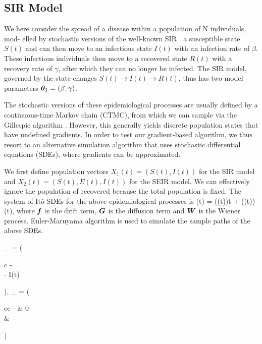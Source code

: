 \documentclass{article}
\theoremstyle{plain}
\theoremstyle{definition}
\theoremstyle{remark}
\newcommand{\Gv}{\bs{G}}
\newcommand{\SIR}{\text{SIR}}
\begin{document}
				\subsection{SIR Model}
				We here consider the spread of a disease within a population of N individuals, mod- elled by stochastic versions of the well-known SIR \citep{allen2008mathematical}. a susceptible state $S(t)$ and can then move to an infectious state $I(t)$ with an infection rate of $\beta$. These infectious individuals then move to a recovered state $R(t)$ with a recovery rate of $\gamma$, after which they can no longer be infected. The SIR model, governed by the state changes $S(t) \rightarrow I(t) \rightarrow R(t)$, thus has two model parameters ${\boldsymbol \theta}_1 = (\beta, \gamma)$. 
				
				The stochastic versions of these epidemiological processes are usually defined by a continuous-time Markov chain (CTMC), from which we can sample via the Gillespie algorithm \citep{allen2017primer}. However, this generally yields discrete population states that have undefined gradients. In order to test our gradient-based algorithm, we thus resort to an alternative simulation algorithm that uses stochastic differential equations (SDEs), where gradients can be approximated. 
				
				We first define population vectors $X_1(t) = (S(t), I(t))$ for the SIR model and $X_2(t) = (S(t), E(t), I(t))$ for the SEIR model. We can effectively ignore the population of recovered because the total population is fixed. The system of Itô SDEs for the above epidemiological processes is
				\beq
				\ud \Xv(t) = \fv(\Xv(t))\ud t + \Gv(\Xv(t)) \ud \Wv(t),
				\eeq
				where ${\boldsymbol f}$ is the drift term, $\Gv$ is the diffusion term and ${\boldsymbol W}$ is the Wiener process. Euler-Maruyama algorithm is used to simulate the sample paths of the above SDEs. 
				
				\beq
				\fv_{\SIR} = \left( \begin{array}{c}
					- \beta{}\\
					\beta{} - \gamma I(t)
				\end{array}
				\right), \Gv_{\SIR} = \left( 
				\begin{array}{cc}
					-\sqrt{\beta\frac{S(t)I(t)}{N}} & 0\\
					 & -\sqrt{\gamma I(t)}
				\end{array}
				\right)
				\eeq
				
\end{document}
